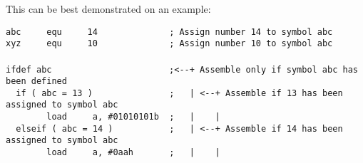         This can be best demonstrated on an example:
                \begin{code}[h!]
                        \mysmallfont{}
                        {\color{highlight_constant}\verb'abc'}\verb'     '{\color{highlight_directive}\verb'equ'}\verb'     '{\color{highlight_unknown_base}\verb'14'}\verb'              '{\color{highlight_comment}\verb'; Assign number 14 to symbol abc'}\\
                        {\color{highlight_constant}\verb'xyz'}\verb'     '{\color{highlight_directive}\verb'equ'}\verb'     '{\color{highlight_unknown_base}\verb'10'}\verb'              '{\color{highlight_comment}\verb'; Assign number 10 to symbol abc'}\\
                        \verb''\\
                        {\color{highlight_directive}\verb'ifdef'}\verb' '{\color{highlight_constant}\verb'abc'}\verb'                       '{\color{highlight_comment}\verb';<--+ Assemble only if symbol abc has been defined'}\\
                        \verb'  '{\color{highlight_directive}\verb'if'}\verb' '{\color{highlight_symbol}\verb'('}\verb' '{\color{highlight_constant}\verb'abc'}\verb' '{\color{highlight_symbol}\verb'='}\verb' '{\color{highlight_unknown_base}\verb'13'}\verb' '{\color{highlight_symbol}\verb')'}\verb'               '{\color{highlight_comment}\verb';   | <--+ Assemble if 13 has been assigned to symbol abc'}\\
                        \verb'        '{\color{highlight_instruction}\verb'load'}\verb'     '{\color{highlight_sfr}\verb'a'}{\color{highlight_oper_sep}\verb','}\verb' '{\color{highlight_imm_bin}\verb'#01010101b'}\verb'  '{\color{highlight_comment}\verb';   |    |'}\\
                        \verb'  '{\color{highlight_directive}\verb'elseif'}\verb' '{\color{highlight_symbol}\verb'('}\verb' '{\color{highlight_constant}\verb'abc'}\verb' '{\color{highlight_symbol}\verb'='}\verb' '{\color{highlight_unknown_base}\verb'14'}\verb' '{\color{highlight_symbol}\verb')'}\verb'           '{\color{highlight_comment}\verb';   | <--+ Assemble if 14 has been assigned to symbol abc'}\\
                        \verb'        '{\color{highlight_instruction}\verb'load'}\verb'     '{\color{highlight_sfr}\verb'a'}{\color{highlight_oper_sep}\verb','}\verb' '{\color{highlight_imm_hex}\verb'#0aah'}\verb'       '{\color{highlight_comment}\verb';   |    |'}\\

\end{code}
